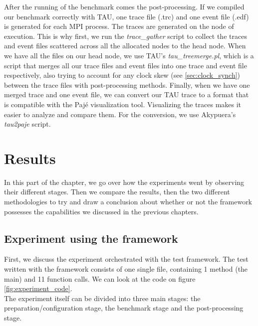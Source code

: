 After the running of the benchmark comes the post-processing. If we
compiled our benchmark correctly with TAU, one trace file (.trc)
and one event file (.edf) is generated for each MPI process. The
traces are generated on the node of execution. This is why first,
we run the \emph{trace\_gather}\cite{ms11} script to collect the traces
and event files scattered across all the allocated nodes to the head
node. When we have all the files on our head node, we use
TAU's \emph{tau\_treemerge.pl}, which is a script that merges all our
trace files and event files into one trace and event file
respectively, also trying to account for any clock skew
(see \ref{sec:clock_synch}) between the trace files with
post-processing methods. Finally, when we have one merged trace and
one event file, we can convert our TAU trace to a format that is
compatible with the Pajé\cite{cob00} visualization tool. Visualizing
the traces makes it easier to analyze and compare them. For the
conversion, we use Akypuera's\cite{s13} \emph{tau2paje}
script.\\[0.3cm]

\section{Results}
In this part of the chapter, we go over how the experiments went by
observing their different stages. Then we compare the results, then
the two different methodologies to try and draw a conclusion about
whether or not the framework possesses the capabilities we discussed
in the previous chapters.
\subsection{Experiment using the framework}
First, we discuss the experiment orchestrated with the test
framework. The test written with the framework consists of one single
file, containing 1 method (the main) and 11 function calls. We can
look at the code on figure \ref{fig:experiment_code}.\\[0.3cm]
The experiment itself can be divided into three main stages: the
preparation/configuration stage, the benchmark stage and the
post-processing stage.

